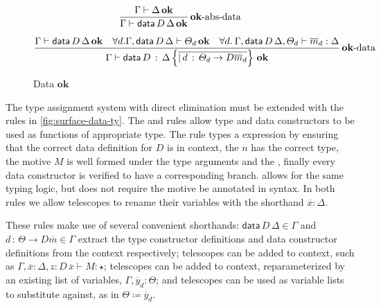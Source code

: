\begin{figure}
\[
\frac{\Gamma\vdash\Delta\,\mathbf{ok}}{\Gamma\vdash\mathsf{data}\,D\,\Delta\,\mathbf{ok}}\operatorname{\mathbf{ok}-abs-data}
\]

\[
\frac{\Gamma\vdash\mathsf{data}\,D\,\Delta\,\mathbf{ok}\quad\forall d.\Gamma,\mathsf{data}\,D\,\Delta\vdash\varTheta_{d}\,\mathbf{ok}\quad\forall d.\:\Gamma,\mathsf{data}\,D\,\Delta,\varTheta_{d}\vdash\overline{m}_{d}:\Delta}{\Gamma\vdash\mathsf{data}\,D\,:\,\Delta\left\{ \overline{|\,d\,:\,\varTheta_{d}\rightarrow D\overline{m}_{d}}\right\} \,\mathbf{ok}}\operatorname{\mathbf{ok}-data}
\]


\caption{\SLang{} Data $\mathbf{ok}$}
\label{fig:surface-data-ok}
\end{figure}

The type assignment system with direct elimination must be extended with the rules in \ref{fig:surface-data-ty}.
The  and  rules allow type and data constructors to be used as functions of appropriate type.
The  rule types a \case{} expression by ensuring that the correct data definition for $D$ is in context, the \scrut{} $n$ has the correct type, the motive $M$ is well formed under the type arguments and the \scrut{}, %
  finally every data constructor is verified to have a corresponding branch.
 allows for the same typing logic, but does not require the motive be annotated in syntax.
In both rules we allow telescopes to rename their variables with the shorthand $\overline{x}:\Delta$.

These rules make use of several convenient shorthands:
  $\mathsf{data}\,D\,\Delta\in\Gamma$ and $d\,:\,\varTheta\rightarrow D\overline{m}\in\Gamma$ extract the type constructor definitions and data constructor definitions from the context respectively;
  telescopes can be added to context, such as $\Gamma,\overline{x}:\Delta,z:D\,\overline{x}\vdash M:\star$;
  telescopes can be added to context, reparameterized by an existing list of variables, $\Gamma,\overline{y}_{d}:\varTheta$;
  and telescopes can be used as variable lists to substitute against, as in $\varTheta\coloneqq\overline{y}_{d}$.

